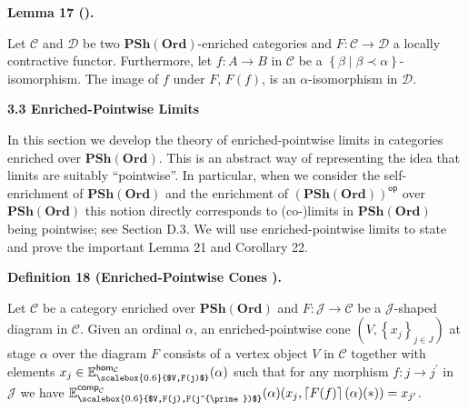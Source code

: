 \documentclass[10pt,a4paper]{article}
\begin{document}
 
\par\medskip\noindent\textbf{Lemma 17 ().}\par
 
 
Let $\mathcal{C}$ and $\mathcal{D}$ be two $\mathbf{PSh}(\mathbf{Ord})$-enriched categories and $F:\mathcal{C}\to\mathcal{D}$ a locally contractive functor. Furthermore, let $f:A\to B$ in $\mathcal{C}$ be a $\left\{\beta\middle|\beta\prec\alpha\right\}$-isomorphism. The image of $f$ under $F$, $F(f)$, is an $\alpha$-isomorphism in $\mathcal{D}$.\par
 
 
 
 
 
\par\medskip\noindent\textbf{3.3 Enriched-Pointwise Limits}\par
 
 
In this section we develop the theory of enriched-pointwise limits in categories enriched over $\mathbf{PSh}(\mathbf{Ord})$. This is an abstract way of representing the idea that limits are suitably “pointwise”. In particular, when we consider the self-enrichment of $\mathbf{PSh}(\mathbf{Ord})$ and the enrichment of ${\left(\mathbf{PSh}(\mathbf{Ord})\right)}^{\mathsf{op}}$ over $\mathbf{PSh}(\mathbf{Ord})$ this notion directly corresponds to (co-)limits in $\mathbf{PSh}(\mathbf{Ord})$ being pointwise; see Section D.3. We will use enriched-pointwise limits to state and prove the important Lemma 21 and Corollary 22.\par
 
 
 
\par\medskip\noindent\textbf{Definition 18 (Enriched-Pointwise Cones ).}\par
 
 
Let $\mathcal{C}$ be a category enriched over $\mathbf{PSh}(\mathbf{Ord})$ and $F:\mathcal{J}\to\mathcal{C}$ be a $\mathcal{J}$-shaped diagram in $\mathcal{C}$. Given an ordinal $\alpha$, an enriched-pointwise cone $(V,\left\{x_{j}\right\}_{j\in J})$ at stage $\alpha$ over the diagram $F$ consists of a vertex object $V$ in $\mathcal{C}$ together with elements $x_{j}\in\mathbb{E}^{\mathsf{hom}_{\mathcal{C}}}_{\scalebox{0.6}{$V,F(j)$}}(\alpha)$ such that for any morphism $f:j\to j^{\prime}$ in $\mathcal{J}$ we have $\mathbb{E}^{\mathsf{comp}_{\mathcal{C}}}_{\scalebox{0.6}{$V,F(j),F(j^{\prime})$}}(\alpha)(x_{j},\left\lceil{F(f)}\right\rceil(\alpha)(*))=x_{j^{\prime}}$.\par
 
\end{document}
